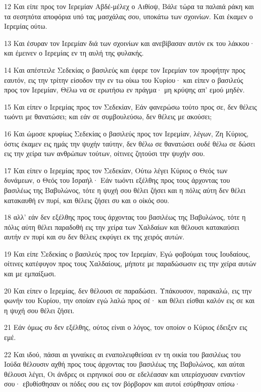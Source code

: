 \par 12 Και είπε προς τον Ιερεμίαν Αβδέ-μέλεχ ο Αιθίοψ, Βάλε τώρα τα παλαιά ράκη και τα σεσηπότα αποφόρια υπό τας μασχάλας σου, υποκάτω των σχοινίων. Και έκαμεν ο Ιερεμίας ούτω.
\par 13 Και έσυραν τον Ιερεμίαν διά των σχοινίων και ανεβίβασαν αυτόν εκ του λάκκου· και έμεινεν ο Ιερεμίας εν τη αυλή της φυλακής.
\par 14 Και απέστειλε Σεδεκίας ο βασιλεύς και έφερε τον Ιερεμίαν τον προφήτην προς εαυτόν, εις την τρίτην είσοδον την εν τω οίκω του Κυρίου· και είπεν ο βασιλεύς προς τον Ιερεμίαν, Θέλω να σε ερωτήσω εν πράγμα· μη κρύψης απ' εμού μηδέν.
\par 15 Και είπεν ο Ιερεμίας προς τον Σεδεκίαν, Εάν φανερώσω τούτο προς σε, δεν θέλεις τωόντι με θανατώσει; και εάν σε συμβουλεύσω, δεν θέλεις με ακούσει;
\par 16 Και ώμοσε κρυφίως Σεδεκίας ο βασιλεύς προς τον Ιερεμίαν, λέγων, Ζη Κύριος, όστις έκαμεν εις ημάς την ψυχήν ταύτην, δεν θέλω σε θανατώσει ουδέ θέλω σε δώσει εις την χείρα των ανθρώπων τούτων, οίτινες ζητούσι την ψυχήν σου.
\par 17 Και είπεν ο Ιερεμίας προς τον Σεδεκίαν, Ούτω λέγει Κύριος ο Θεός των δυνάμεων, ο Θεός του Ισραήλ· Εάν τωόντι εξέλθης προς τους άρχοντας του βασιλέως της Βαβυλώνος, τότε η ψυχή σου θέλει ζήσει και η πόλις αύτη δεν θέλει κατακαυθή εν πυρί, και θέλεις ζήσει συ και ο οίκός σου.
\par 18 αλλ' εάν δεν εξέλθης προς τους άρχοντας του βασιλέως της Βαβυλώνος, τότε η πόλις αύτη θέλει παραδοθή εις την χείρα των Χαλδαίων και θέλουσι κατακαύσει αυτήν εν πυρί και συ δεν θέλεις εκφύγει εκ της χειρός αυτών.
\par 19 Και είπε Σεδεκίας ο βασιλεύς προς τον Ιερεμίαν, Εγώ φοβούμαι τους Ιουδαίους, οίτινες κατέφυγον προς τους Χαλδαίους, μήποτε με παραδώσωσιν εις την χείρα αυτών και με εμπαίξωσι.
\par 20 Και είπεν ο Ιερεμίας, δεν θέλουσι σε παραδώσει. Υπάκουσον, παρακαλώ, εις την φωνήν του Κυρίου, την οποίαν εγώ λαλώ προς σέ· και θέλει είσθαι καλόν εις σε και η ψυχή σου θέλει ζήσει.
\par 21 Εάν όμως συ δεν εξέλθης, ούτος είναι ο λόγος, τον οποίον ο Κύριος έδειξεν εις εμέ.
\par 22 Και ιδού, πάσαι αι γυναίκες αι εναπολειφθείσαι εν τη οικία του βασιλέως του Ιούδα θέλουσιν αχθή προς τους άρχοντας του βασιλέως της Βαβυλώνος, και αύται θέλουσι λέγει, Οι άνδρες οι ειρηνικοί σου σε εδελέασαν και υπερίσχυσαν εναντίον σου· εβυθίσθησαν οι πόδες σου εις τον βόρβορον και αυτοί εσύρθησαν οπίσω·
